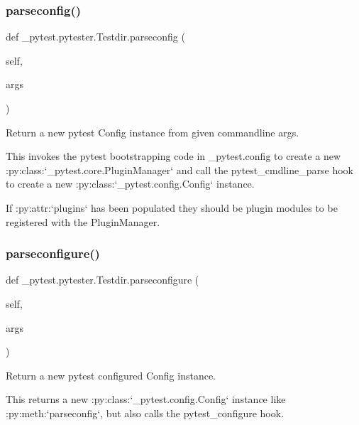 \subsubsection{\texorpdfstring{parseconfig()}{parseconfig()}}
{\footnotesize\ttfamily def \+\_\+pytest.\+pytester.\+Testdir.\+parseconfig (\begin{DoxyParamCaption}\item[{}]{self,  }\item[{}]{args }\end{DoxyParamCaption})}

\begin{DoxyVerb}Return a new pytest Config instance from given commandline args.

This invokes the pytest bootstrapping code in _pytest.config to create
a new :py:class:`_pytest.core.PluginManager` and call the
pytest_cmdline_parse hook to create a new
:py:class:`_pytest.config.Config` instance.

If :py:attr:`plugins` has been populated they should be plugin modules
to be registered with the PluginManager.\end{DoxyVerb}
 \mbox{\label{class__pytest_1_1pytester_1_1_testdir_a487dc4e180e9b1481c792f51da389fc5}} 
\subsubsection{\texorpdfstring{parseconfigure()}{parseconfigure()}}
{\footnotesize\ttfamily def \+\_\+pytest.\+pytester.\+Testdir.\+parseconfigure (\begin{DoxyParamCaption}\item[{}]{self,  }\item[{}]{args }\end{DoxyParamCaption})}

\begin{DoxyVerb}Return a new pytest configured Config instance.

This returns a new :py:class:`_pytest.config.Config` instance like
:py:meth:`parseconfig`, but also calls the pytest_configure hook.\end{DoxyVerb}
 \mbox{\label{class__pytest_1_1pytester_1_1_testdir_a415eccf041216a08c27c8e32b1185084}} 
